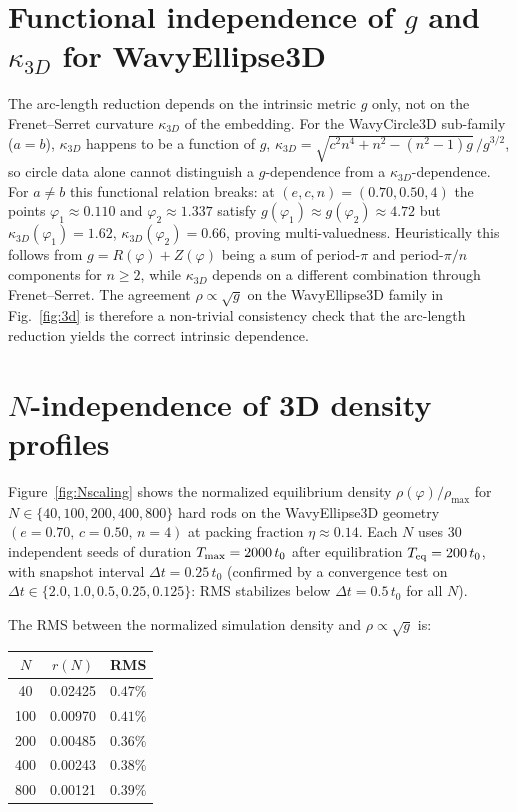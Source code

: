 \documentclass[aps,pre,twocolumn,superscriptaddress,longbibliography,floatfix]{revtex4-2}
\begin{document}
\section{Functional independence of $g$ and $\kappa_{3D}$ for WavyEllipse3D}
\label{app:decoupling}

The arc-length reduction depends on the intrinsic metric $g$ only, not on the
Frenet--Serret curvature $\kappa_{3D}$ of the embedding.
For the WavyCircle3D sub-family ($a=b$), $\kappa_{3D}$ happens to be a function of $g$,
$\kappa_{3D}=\sqrt{c^2n^4+n^2-(n^2-1)g}\,/g^{3/2}$, so circle data alone cannot
distinguish a $g$-dependence from a $\kappa_{3D}$-dependence.
For $a\neq b$ this functional relation breaks: at $(e,c,n)=(0.70,0.50,4)$ the points
$\varphi_1\approx 0.110$ and $\varphi_2\approx 1.337$ satisfy $g(\varphi_1)\approx
g(\varphi_2)\approx 4.72$ but $\kappa_{3D}(\varphi_1)=1.62$, $\kappa_{3D}(\varphi_2)=0.66$,
proving multi-valuedness.
Heuristically this follows from $g=R(\varphi)+Z(\varphi)$ being a sum of period-$\pi$ and
period-$\pi/n$ components for $n\geq 2$, while $\kappa_{3D}$ depends on a different
combination through Frenet--Serret.
The agreement $\rho\propto\sqrt{g}$ on the WavyEllipse3D family in
Fig.~\ref{fig:3d} is therefore a non-trivial consistency check that the
arc-length reduction yields the correct intrinsic dependence.

\section{$N$-independence of 3D density profiles}
\label{app:Nscaling}

Figure~\ref{fig:Nscaling} shows the normalized equilibrium density
$\rho(\varphi)/\rho_{\max}$ for $N\in\{40,100,200,400,800\}$ hard rods on the
WavyEllipse3D geometry $(e=0.70,\,c=0.50,\,n=4)$ at packing fraction $\eta\approx 0.14$.
Each $N$ uses 30 independent seeds of duration $T_{\rm max}=2000\,t_0$ after
equilibration $T_{\rm eq}=200\,t_0$, with snapshot interval $\Delta t=0.25\,t_0$
(confirmed by a convergence test on $\Delta t\in\{2.0,1.0,0.5,0.25,0.125\}$:
RMS stabilizes below $\Delta t=0.5\,t_0$ for all $N$).

The RMS between the normalized simulation density and $\rho\propto\sqrt{g}$ is:
\begin{center}
\begin{tabular}{ccc}
$N$ & $r(N)$ & RMS \\
\hline
40  & 0.02425 & $0.47\%$ \\
100 & 0.00970 & $0.41\%$ \\
200 & 0.00485 & $0.36\%$ \\
400 & 0.00243 & $0.38\%$ \\
800 & 0.00121 & $0.39\%$ \\
\end{tabular}
\end{center}
\end{document}
